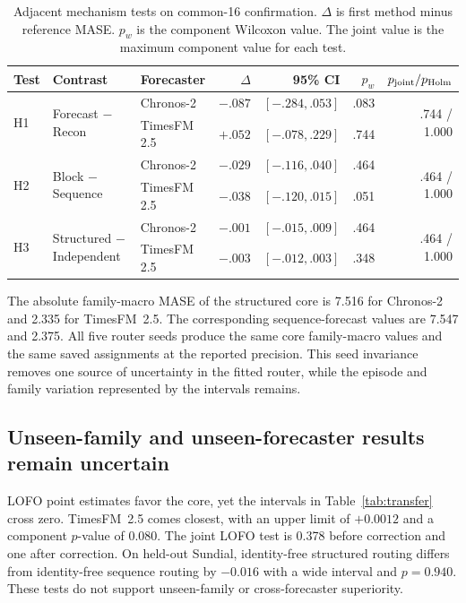 \documentclass{article}
\begin{document}
\begin{table}[t]
\caption{Adjacent mechanism tests on common-16 confirmation. $\Delta$ is first method minus reference MASE. $p_w$ is the component Wilcoxon value. The joint value is the maximum component value for each test.}
\label{tab:adjacent}
\centering
\scriptsize
\setlength{\tabcolsep}{2.7pt}
\begin{tabular}{lllrrrr}
\toprule
Test & Contrast & Forecaster & $\Delta$ & 95\% CI & $p_w$ & $p_{\rm joint}/p_{\rm Holm}$ \\
\midrule
\multirow{2}{*}{H1} & \multirow{2}{*}{Forecast $-$ Recon} & Chronos-2 & $-.087$ & $[-.284,.053]$ & .083 & \multirow{2}{*}{.744 / 1.000} \\
 & & TimesFM 2.5 & $+.052$ & $[-.078,.229]$ & .744 & \\
\midrule
\multirow{2}{*}{H2} & \multirow{2}{*}{Block $-$ Sequence} & Chronos-2 & $-.029$ & $[-.116,.040]$ & .464 & \multirow{2}{*}{.464 / 1.000} \\
 & & TimesFM 2.5 & $-.038$ & $[-.120,.015]$ & .051 & \\
\midrule
\multirow{2}{*}{H3} & \multirow{2}{*}{Structured $-$ Independent} & Chronos-2 & $-.001$ & $[-.015,.009]$ & .464 & \multirow{2}{*}{.464 / 1.000} \\
 & & TimesFM 2.5 & $-.003$ & $[-.012,.003]$ & .348 & \\
\bottomrule
\end{tabular}
\end{table}

The absolute family-macro MASE of the structured core is 7.516 for Chronos-2 and 2.335 for TimesFM~2.5. The corresponding sequence-forecast values are 7.547 and 2.375. All five router seeds produce the same core family-macro values and the same saved assignments at the reported precision. This seed invariance removes one source of uncertainty in the fitted router, while the episode and family variation represented by the intervals remains.

\subsection{Unseen-family and unseen-forecaster results remain uncertain}

LOFO point estimates favor the core, yet the intervals in Table~\ref{tab:transfer} cross zero. TimesFM~2.5 comes closest, with an upper limit of $+0.0012$ and a component $p$-value of 0.080. The joint LOFO test is 0.378 before correction and one after correction. On held-out Sundial, identity-free structured routing differs from identity-free sequence routing by $-0.016$ with a wide interval and $p=0.940$. These tests do not support unseen-family or cross-forecaster superiority.
\end{document}

